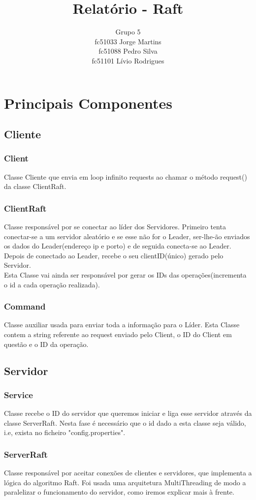 \documentclass[12pt,a4paper]{report}
\author{Grupo 5 \\fc51033 Jorge Martins \\ fc51088 Pedro Silva \\ fc51101 Lívio Rodrigues}
\date{}
\begin{document}
\title{Relatório - Raft}
\maketitle
\tableofcontents
\chapter{Principais Componentes}
\section{Cliente}
\subsection{Client}
Classe Cliente que envia em loop infinito requests ao chamar o método request() da classe ClientRaft.
\subsection{ClientRaft}
Classe responsável por se conectar ao líder dos Servidores. Primeiro tenta conectar-se a um servidor aleatório e se esse não for o Leader, ser-lhe-ão enviados os dados do Leader(endereço ip e porto) e de seguida conecta-se ao Leader. Depois de conectado ao Leader, recebe o seu clientID(único) gerado pelo Servidor. \\
Esta Classe vai ainda ser responsável por gerar os IDs das operações(incrementa o id a cada operação realizada).
\subsection{Command}
Classe auxiliar usada para enviar toda a informação para o Líder. Esta Classe contem a string referente ao request enviado pelo Client, o ID do Client em questão e o ID da operação.

\section{Servidor}
\subsection{Service}
Classe recebe o ID do servidor que queremos iniciar e liga esse servidor através da classe ServerRaft. Nesta fase é necessário que o id dado a esta classe seja válido, i.e, exista no ficheiro "config.properties".
\subsection{ServerRaft}
Classe responsável por aceitar conexões de clientes e servidores, que implementa a lógica do algoritmo Raft. Foi usada uma arquitetura MultiThreading de modo a paralelizar o funcionamento do servidor, como iremos explicar mais à frente.
\end{document}
